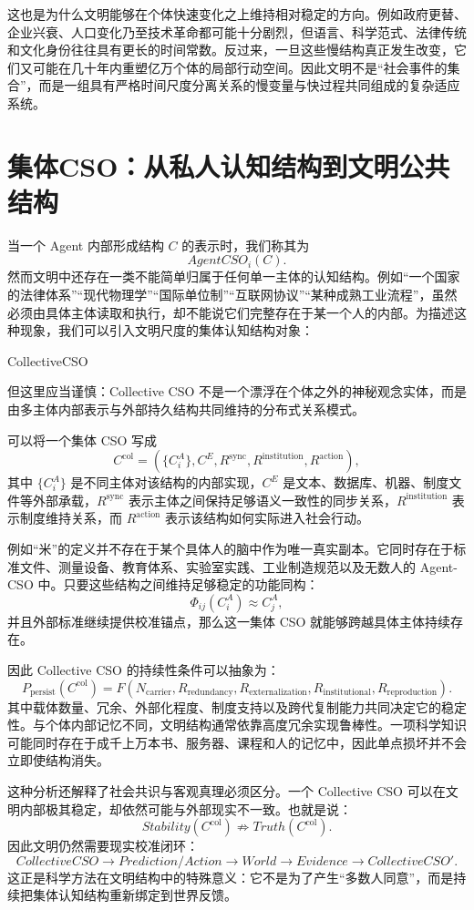 这也是为什么文明能够在个体快速变化之上维持相对稳定的方向。例如政府更替、企业兴衰、人口变化乃至技术革命都可能十分剧烈，但语言、科学范式、法律传统和文化身份往往具有更长的时间常数。反过来，一旦这些慢结构真正发生改变，它们又可能在几十年内重塑亿万个体的局部行动空间。因此文明不是“社会事件的集合”，而是一组具有严格时间尺度分离关系的慢变量与快过程共同组成的复杂适应系统。

\section{集体CSO：从私人认知结构到文明公共结构}

当一个 Agent 内部形成结构 $C$ 的表示时，我们称其为
\[
AgentCSO_i(C).
\]
然而文明中还存在一类不能简单归属于任何单一主体的认知结构。例如“一个国家的法律体系”“现代物理学”“国际单位制”“互联网协议”“某种成熟工业流程”，虽然必须由具体主体读取和执行，却不能说它们完整存在于某一个人的内部。为描述这种现象，我们可以引入文明尺度的集体认知结构对象：
\begin{statementbox}
CollectiveCSO
\end{statementbox}
但这里应当谨慎：Collective CSO 不是一个漂浮在个体之外的神秘观念实体，而是由多主体内部表示与外部持久结构共同维持的分布式关系模式。

可以将一个集体 CSO 写成
\[
C^{\mathrm{col}}
=
\left(
\{C_i^{A}\},
C^{E},
R^{\mathrm{sync}},
R^{\mathrm{institution}},
R^{\mathrm{action}}
\right),
\]
其中 $\{C_i^{A}\}$ 是不同主体对该结构的内部实现，$C^{E}$ 是文本、数据库、机器、制度文件等外部承载，$R^{\mathrm{sync}}$ 表示主体之间保持足够语义一致性的同步关系，$R^{\mathrm{institution}}$ 表示制度维持关系，而 $R^{\mathrm{action}}$ 表示该结构如何实际进入社会行动。

例如“米”的定义并不存在于某个具体人的脑中作为唯一真实副本。它同时存在于标准文件、测量设备、教育体系、实验室实践、工业制造规范以及无数人的 Agent-CSO 中。只要这些结构之间维持足够稳定的功能同构：
\[
\Phi_{ij}(C_i^A)\approx C_j^A,
\]
并且外部标准继续提供校准锚点，那么这一集体 CSO 就能够跨越具体主体持续存在。

因此 Collective CSO 的持续性条件可以抽象为：
\[
P_{\mathrm{persist}}(C^{\mathrm{col}})
=
F(
N_{\mathrm{carrier}},
R_{\mathrm{redundancy}},
R_{\mathrm{externalization}},
R_{\mathrm{institutional}},
R_{\mathrm{reproduction}}
).
\]
其中载体数量、冗余、外部化程度、制度支持以及跨代复制能力共同决定它的稳定性。与个体内部记忆不同，文明结构通常依靠高度冗余实现鲁棒性。一项科学知识可能同时存在于成千上万本书、服务器、课程和人的记忆中，因此单点损坏并不会立即使结构消失。

这种分析还解释了社会共识与客观真理必须区分。一个 Collective CSO 可以在文明内部极其稳定，却依然可能与外部现实不一致。也就是说：
\[
Stability(C^{\mathrm{col}})
\not\Rightarrow
Truth(C^{\mathrm{col}}).
\]
因此文明仍然需要现实校准闭环：
\[
CollectiveCSO
\rightarrow
Prediction/Action
\rightarrow
World
\rightarrow
Evidence
\rightarrow
CollectiveCSO'.
\]
这正是科学方法在文明结构中的特殊意义：它不是为了产生“多数人同意”，而是持续把集体认知结构重新绑定到世界反馈。


